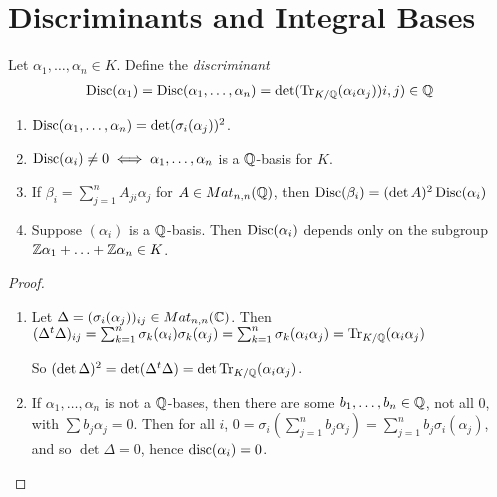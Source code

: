 \documentclass[10pt,a4paper]{article}
\begin{document}
\section{Discriminants and Integral Bases}
Let $\alpha_1, \ldots, \alpha_n \in K$. Define the \emph{discriminant}
\begin{align*}
\operatorname{Disc}(\alpha_1) = \operatorname{Disc}(\alpha_1, \ldots, \alpha_n) = \det(\operatorname{Tr}_{K/\mathbb{Q}}(\alpha_i\alpha_j))i,j) \in \mathbb{Q}
\end{align*}
\begin{theorem}
\item
\begin{enumerate}
\item $\operatorname{Disc}(\alpha_1, \ldots, \alpha_n) = \det(\sigma_i(\alpha_j))^2$.
\item $\operatorname{Disc}(\alpha_i) \neq 0  \iff \alpha_1, \ldots, \alpha_n$ is a $\mathbb{Q}$-basis for $K$.
\item If $\beta_i = \sum_{j=1}^n A_{ji}\alpha_j$ for $A \in Mat_{n,n}(\mathbb{Q})$, then $\operatorname{Disc}(\beta_i) = (\det A)^2\operatorname{Disc}(\alpha_i)$
\item Suppose $(\alpha_i)$ is a $\mathbb{Q}$-basis. Then $\operatorname{Disc}(\alpha_i)$ depends only on the subgroup $\mathbb{Z}\alpha_1+\ldots+\mathbb{Z}\alpha_n \in K$.
\end{enumerate}
\end{theorem}
\begin{proof}
\item
\begin{enumerate}
\item Let $\Delta = (\sigma_i(\alpha_j))_{ij} \in Mat_{n,n}(\mathbb{C})$. Then $(\Delta^t\Delta)_{ij} = \sum_{k=1}^n \sigma_k(\alpha_i)\sigma_k(\alpha_j) = \sum_{k=1}^n \sigma_k(\alpha_i\alpha_j) = \operatorname{Tr}_{K/\mathbb{Q}}(\alpha_i\alpha_j)$

So $(\det \Delta)^2 = \det(\Delta^t\Delta) = \det\operatorname{Tr}_{K/\mathbb{Q}}(\alpha_i\alpha_j)$.

\item If $\alpha_1, \ldots, \alpha_n$ is not a $\mathbb{Q}$-bases, then there are some $b_1, \ldots, b_n \in \mathbb{Q}$, not all $0$, with $\sum b_j\alpha_j = 0$. Then for all $i$, $0 = \sigma_i\left(\sum_{j=1}^n b_j\alpha_j\right) = \sum_{j=1}^n b_j\sigma_i(\alpha_j)$, and so $\det \Delta = 0$, hence $\operatorname{disc}(\alpha_i) = 0$.
\end{enumerate}
\end{proof}
\end{document}
